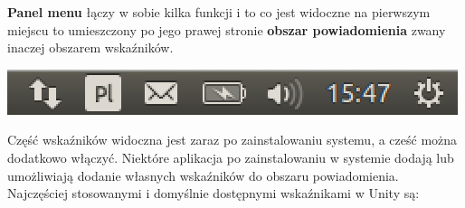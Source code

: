 \textbf{Panel menu} łączy w sobie kilka funkcji i to co jest widoczne na pierwszym miejscu to umieszczony po jego prawej stronie \textbf{obszar powiadomienia} zwany inaczej obszarem wskaźników.

\begin{center}
	\includegraphics[scale=0.4]{images/unity_menu_bar.png}
\end{center}

Część wskaźników widoczna jest zaraz po zainstalowaniu systemu, a cześć można dodatkowo włączyć. Niektóre aplikacja po zainstalowaniu w systemie dodają lub umożliwiają dodanie własnych wskaźników do obszaru powiadomienia. Najczęściej stosowanymi i domyślnie dostępnymi wskaźnikami w Unity są:
